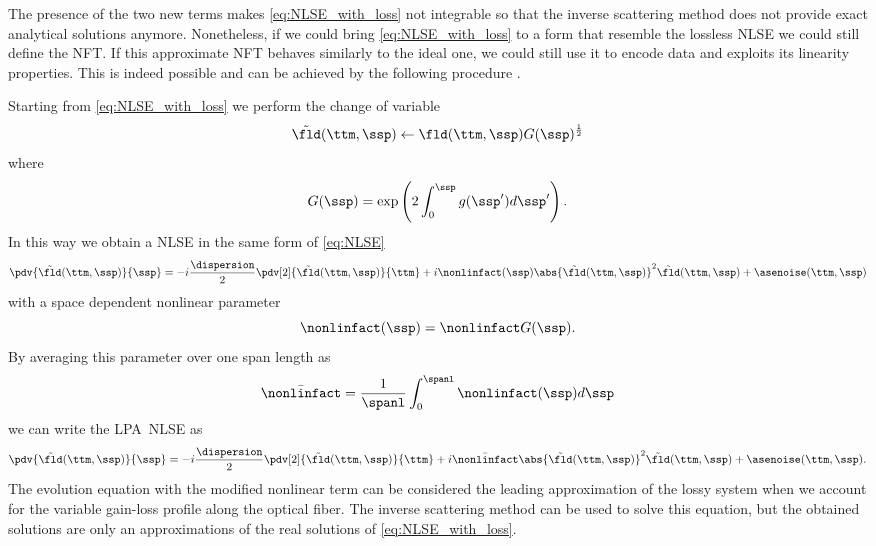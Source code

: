 The presence of the two new terms makes \eqref{eq:NLSE_with_loss} not
integrable so that the inverse scattering method does not provide exact analytical solutions
anymore. Nonetheless, if we could bring \eqref{eq:NLSE_with_loss} to a form that resemble the lossless \ac{NLSE} we could still define the \ac{NFT}. If this approximate \ac{NFT} behaves similarly to the ideal one, we could still use it to encode data and exploits its linearity properties. This is indeed possible and can be achieved by the following procedure \cite{hasegawa1995solitons}.

Starting from \eqref{eq:NLSE_with_loss} we perform the change of variable
\begin{equation}
  \tilde{\fld}(\ttm,\ssp) \leftarrow{} \fld(\ttm,\ssp)G(\ssp)^{\frac{1}{2}}
\end{equation}
where
\begin{equation}
  G(\ssp) = \exp\left(2\int_{0}^{\ssp} g(\ssp') d\ssp' \right).
\end{equation}
In this way we obtain a \ac{NLSE} in the same form of \eqref{eq:NLSE}
\begin{equation}\label{eq:NLSE_with_loss_after_change_var}
\pdv{\tilde{\fld}(\ttm,\ssp)}{\ssp} =
-i \frac{\dispersion}{2} \pdv[2]{\tilde{\fld}(\ttm,\ssp)}{\ttm}
+ i\nonlinfact(\ssp) \abs{\tilde{\fld}(\ttm,\ssp)}^2 \tilde{\fld}(\ttm,\ssp)
+ \asenoise(\ttm,\ssp)
\end{equation}
with a space dependent nonlinear parameter
\begin{equation}
 \nonlinfact(\ssp) = \nonlinfact G(\ssp).
\end{equation}
By averaging this parameter over one span length as
\begin{equation}\label{eq:lpa_nonlinear_coefficient}
  \bar{\nonlinfact} = \dfrac{1}{\spanl}\int_{0}^{\spanl} \nonlinfact(\ssp) d\ssp
\end{equation}
we can write the \ac{LPA}~\ac{NLSE} \cite{hasegawa1995solitons, Hasegawa:90} as
\begin{equation}\label{eq:NLSE_LPA}
  \pdv{\tilde{\fld} (\ttm,\ssp)}{\ssp} =
  -i \frac{\dispersion}{2} \pdv[2]{\tilde{\fld}(\ttm,\ssp)}{\ttm}
  + i\bar{\nonlinfact}\abs{\tilde{\fld}(\ttm,\ssp)}^2 \tilde{\fld}(\ttm,\ssp)
  + \asenoise(\ttm,\ssp).
\end{equation}
The evolution equation with the modified nonlinear term can be considered the leading approximation of the lossy system when we account for the variable gain-loss profile along the optical fiber.
The inverse scattering method can be used to solve this equation, but the obtained solutions are only
an approximations of the real solutions of \eqref{eq:NLSE_with_loss}.

